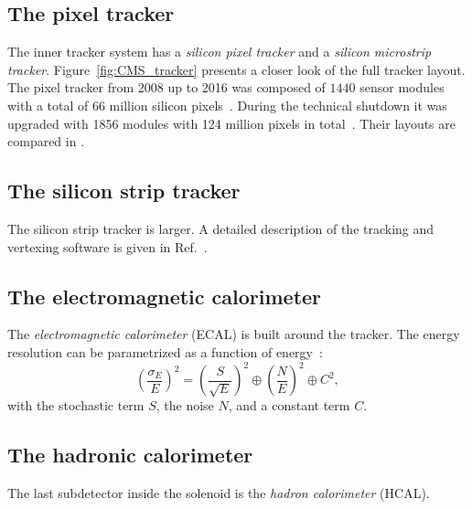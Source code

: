\subsection{The pixel tracker}
The inner tracker system has a \emph{silicon pixel tracker} and a \emph{silicon microstrip tracker}. Figure~\ref{fig:CMS_tracker} presents a closer look of the full tracker layout.
The pixel tracker from 2008 up to 2016 was composed of $1440$ sensor modules with a total of $66$ million silicon pixels~\cite{CMS_vertex}.
During the technical shutdown it was upgraded with 1856 modules with 124 million pixels in total~\cite{CMS_pixel_Phase1_2017,CMS_pixel_Phase1_2021}.
Their layouts are compared in .

\subsection{The silicon strip tracker}
The silicon strip tracker is larger.
A detailed description of the tracking and vertexing software is given in Ref.~\cite{CMS_vertex}.

\subsection{The electromagnetic calorimeter}
The \emph{electromagnetic calorimeter} (ECAL) is built around the tracker.
The energy resolution can be parametrized as a function of energy~\cite{CMS}:
\begin{equation}
  \left(\frac{\sigma_E}{E}\right)^2 = \left(\frac{S}{\sqrt{E}}\right)^2 \oplus \left(\frac{N}{E}\right)^2 \oplus C^2,
\end{equation}
with the stochastic term $S$, the noise $N$, and a constant term $C$.

\subsection{The hadronic calorimeter}
The last subdetector inside the solenoid is the \emph{hadron calorimeter} (HCAL).

